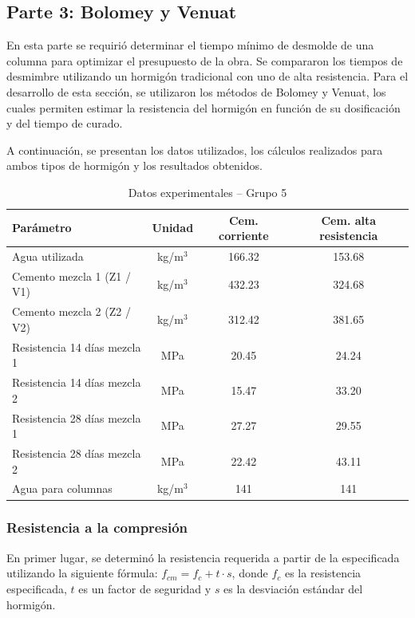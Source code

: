 \subsection*{Parte 3: Bolomey y Venuat}

En esta parte se requirió determinar el tiempo mínimo de desmolde de una columna para optimizar el presupuesto de la obra. Se compararon los tiempos de desmimbre utilizando un hormigón tradicional con uno de alta resistencia. 
Para el desarrollo de esta sección, se utilizaron los métodos de Bolomey y Venuat, los cuales permiten estimar la resistencia del hormigón en función de su dosificación y del tiempo de curado.

A continuación, se presentan los datos utilizados, los cálculos realizados para ambos tipos de hormigón y los resultados obtenidos.

\begin{table}[H]
\centering
\caption{Datos experimentales – Grupo 5}
\renewcommand{\arraystretch}{1.15}
\small
\begin{tabular}{lccc}
\hline
\textbf{Parámetro} & \textbf{Unidad} & \textbf{Cem. corriente} & \textbf{Cem. alta resistencia} \\ \hline
Agua utilizada & kg/m$^3$ & 166.32 & 153.68 \\
Cemento mezcla 1 (Z1 / V1) & kg/m$^3$ & 432.23 & 324.68 \\
Cemento mezcla 2 (Z2 / V2) & kg/m$^3$ & 312.42 & 381.65 \\
Resistencia 14 días mezcla 1 & MPa & 20.45 & 24.24 \\
Resistencia 14 días mezcla 2 & MPa & 15.47 & 33.20 \\
Resistencia 28 días mezcla 1 & MPa & 27.27 & 29.55 \\
Resistencia 28 días mezcla 2 & MPa & 22.42 & 43.11 \\
Agua para columnas & kg/m$^3$ & 141 & 141\\ \hline
\end{tabular}
\end{table}

\subsubsection{Resistencia a la compresión}

En primer lugar, se determinó la resistencia requerida a partir de la especificada utilizando la siguiente fórmula: $f_{cm} = f_c + t \cdot s$, donde $f_c$ es la resistencia especificada, $t$ es un factor de seguridad y $s$ es la desviación estándar del hormigón.

